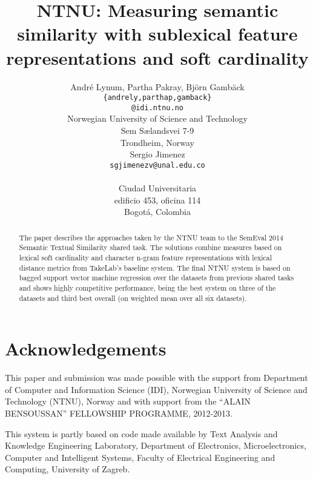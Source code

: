 \documentclass[11pt]{article}
\title{NTNU: Measuring semantic similarity with sublexical feature representations and soft cardinality}
\author{Andr\'{e} Lynum, Partha Pakray, Bj\"{o}rn Gamb\"{a}ck\\
  {\tt \{andrely,parthap,gamback\}} \\
  {\tt  @idi.ntnu.no} \\
  Norwegian University of Science and Technology \\
  Sem S{\ae}landsvei 7-9 \\
  Trondheim, Norway \\
  \And
  Sergio Jimenez \\
  {\tt sgjimenezv@unal.edu.co}\\
  \\
  Ciudad Universitaria \\
  edificio 453, oficina 114\\
  Bogot{\' a}, Colombia \\
}
\date{}
\begin{document}
\maketitle

\begin{abstract}
The paper describes the approaches taken by the NTNU team
to the SemEval 2014  Semantic Textual Similarity  shared task.
The solutions combine measures based on lexical soft cardinality 
and character n-gram feature representations
with  lexical distance metrics from TakeLab's baseline system. 
The final NTNU system is based on bagged support vector machine regression
over the datasets from previous shared tasks and shows highly
competitive performance, being the
best  system on three of the datasets and third
best overall (on weighted mean over all six datasets).
\end{abstract}













\section*{Acknowledgements}
\label{sec:acknowledgements}

This paper and submission was made possible with the support from Department of Computer and Information Science (IDI), Norwegian University of Science and Technology (NTNU), Norway and with support from the “ALAIN BENSOUSSAN” FELLOWSHIP PROGRAMME, 2012-2013.

This system is partly based on code made available by Text Analysis and Knowledge Engineering Laboratory,
Department of Electronics, Microelectronics, Computer and Intelligent Systems,
Faculty of Electrical Engineering and Computing,
University of Zagreb.



\end{document}
